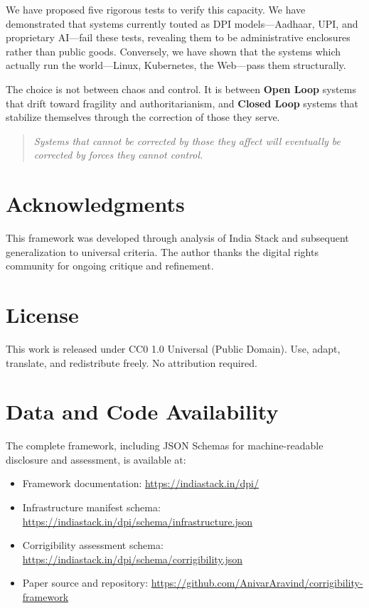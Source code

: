 \documentclass{article}
\begin{document}
We have proposed five rigorous tests to verify this capacity. We have demonstrated that systems currently touted as DPI models---Aadhaar, UPI, and proprietary AI---fail these tests, revealing them to be administrative enclosures rather than public goods. Conversely, we have shown that the systems which actually run the world---Linux, Kubernetes, the Web---pass them structurally.

The choice is not between chaos and control. It is between \textbf{Open Loop} systems that drift toward fragility and authoritarianism, and \textbf{Closed Loop} systems that stabilize themselves through the correction of those they serve.

\begin{quote}
\textit{Systems that cannot be corrected by those they affect will eventually be corrected by forces they cannot control.}
\end{quote}

\section*{Acknowledgments}

This framework was developed through analysis of India Stack and subsequent generalization to universal criteria. The author thanks the digital rights community for ongoing critique and refinement.

\section*{License}

This work is released under CC0 1.0 Universal (Public Domain). Use, adapt, translate, and redistribute freely. No attribution required.

\section*{Data and Code Availability}

The complete framework, including JSON Schemas for machine-readable disclosure and assessment, is available at:

\begin{itemize}
    \item Framework documentation: \url{https://indiastack.in/dpi/}
    \item Infrastructure manifest schema: \url{https://indiastack.in/dpi/schema/infrastructure.json}
    \item Corrigibility assessment schema: \url{https://indiastack.in/dpi/schema/corrigibility.json}
    \item Paper source and repository: \url{https://github.com/AnivarAravind/corrigibility-framework}
\end{itemize}
\end{document}
